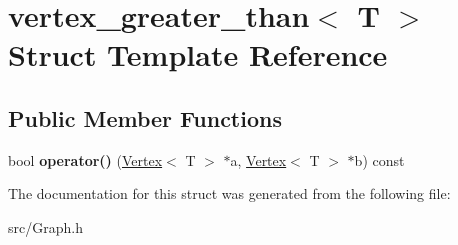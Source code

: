\hypertarget{structvertex__greater__than}{}\section{vertex\+\_\+greater\+\_\+than$<$ T $>$ Struct Template Reference}
\label{structvertex__greater__than}
\subsection*{Public Member Functions}
\begin{DoxyCompactItemize}
\item 
\hypertarget{structvertex__greater__than_acb041eee618f7d56a3685c7aaf347df6}{}\label{structvertex__greater__than_acb041eee618f7d56a3685c7aaf347df6} 
bool {\bfseries operator()} (\hyperlink{class_vertex}{Vertex}$<$ T $>$ $\ast$a, \hyperlink{class_vertex}{Vertex}$<$ T $>$ $\ast$b) const
\end{DoxyCompactItemize}


The documentation for this struct was generated from the following file\+:\begin{DoxyCompactItemize}
\item 
src/Graph.\+h\end{DoxyCompactItemize}
